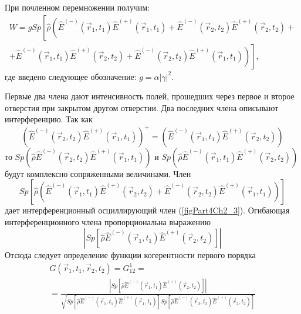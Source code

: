 При почленном перемножении получим:
\begin{eqnarray}
W = 
g Sp \left[\hat{\rho}
\left( 
\hat{E}^{(-)}\left(\vec{r}_1, t_1\right) \hat{E}^{(+)}\left(\vec{r}_1,
t_1\right) +
\hat{E}^{(-)}\left(\vec{r}_2, t_2\right) \hat{E}^{(+)}\left(\vec{r}_2,
t_2\right) +
\right.
\right.
\nonumber \\
\left.
\left.
+
\hat{E}^{(-)}\left(\vec{r}_1, t_1\right) \hat{E}^{(+)}\left(\vec{r}_2,
t_2\right) +
\hat{E}^{(-)}\left(\vec{r}_2, t_2\right) \hat{E}^{(+)}\left(\vec{r}_1,
t_1\right)
\right)
\right],
\label{eqCh4_12}
\end{eqnarray}
где введено следующее обозначение: $g = \alpha \left|\gamma\right|^2$.

Первые два члена дают интенсивность полей, прошедших через первое и
второе отверстия при закрытом другом отверстии. Два последних члена
описывают интерференцию. Так как  
\[
\left(\hat{E}^{(-)}\left(\vec{r}_2, t_2\right) \hat{E}^{(+)}\left(\vec{r}_1,
t_1\right)\right)^{+} = 
\left(\hat{E}^{(-)}\left(\vec{r}_1, t_1\right) \hat{E}^{(+)}\left(\vec{r}_2,
t_2\right)\right)
\]
то  
\(
Sp\left(\hat{\rho}\hat{E}^{(-)}\left(\vec{r}_2, t_2\right) \hat{E}^{(+)}\left(\vec{r}_1,
t_1\right)\right)
\)
и 
\(
Sp\left(\hat{\rho}\hat{E}^{(-)}\left(\vec{r}_1, t_1\right) \hat{E}^{(+)}\left(\vec{r}_2,
t_2\right)\right)
\)
будут комплексно сопряженными величинами. Член 
\[
Sp 
\left[
\hat{\rho}
\left(
\hat{E}^{(-)}\left(\vec{r}_1, t_1\right) \hat{E}^{(+)}\left(\vec{r}_2,
t_2\right) +
\hat{E}^{(-)}\left(\vec{r}_2, t_2\right) \hat{E}^{(+)}\left(\vec{r}_1,
t_1\right)
\right)
\right]
\]
дает
интерференционный осциллирующий член (\autoref{figPart4Ch2_3}). Огибающая
интерференционного члена пропорциональна выражению 
\begin{equation}
\left|
Sp \left[
\hat{\rho}
\hat{E}^{(-)}\left(\vec{r}_1, t_1\right) \hat{E}^{(+)}\left(\vec{r}_2,
t_2\right)
\right]
\right|
\label{eqCh4_13}
\end{equation}
Отсюда следует определение функции когерентности первого порядка
\begin{eqnarray}
G\left(\vec{r}_1, t_1, \vec{r}_2, t_2\right) = 
G_{12}^{1} = 
\nonumber \\
= \frac{\left|
Sp \left[
\hat{\rho}
\hat{E}^{(-)}\left(\vec{r}_1, t_1\right) \hat{E}^{(+)}\left(\vec{r}_2,
t_2\right)
\right]
\right|}
{\sqrt{
Sp \left[
\hat{\rho}
\hat{E}^{(-)}\left(\vec{r}_1, t_1\right) \hat{E}^{(+)}\left(\vec{r}_1,
t_1\right)
\right]
Sp \left[
\hat{\rho}
\hat{E}^{(-)}\left(\vec{r}_2, t_2\right) \hat{E}^{(+)}\left(\vec{r}_2,
t_2\right)
\right]
}}
\label{eqCh4_14}
\end{eqnarray}

